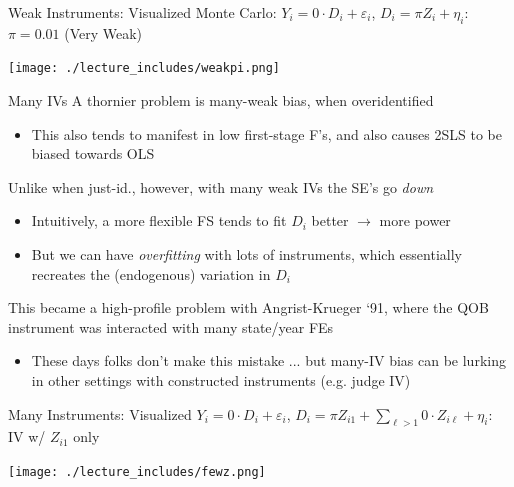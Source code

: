 \documentclass{beamer}
\begin{document}
\begin{frame}{Weak Instruments: Visualized}
\vspace{-0.2cm}
Monte Carlo: $Y_i=0\cdot D_i + \varepsilon_i$, $D_i=\pi Z_i+\eta_i$: $\pi=0.01$ (Very Weak)
\begin{center}
\texttt{[image: ./lecture\_includes/weakpi.png]}
\end{center}

\end{frame}

\begin{frame}{Many IVs}
\vspace{-0.2cm}
A thornier problem is many-weak bias, when overidentified\smallskip
\begin{itemize}
\item This also tends to manifest in low first-stage F's, and also causes 2SLS to be biased towards OLS
\end{itemize}\bigskip\pause{}

Unlike when just-id., however, with many weak IVs the SE's go \emph{down}\smallskip
\begin{itemize}
  \item Intuitively, a more flexible FS tends to fit $D_i$ better $\rightarrow$ more power\smallskip
  \item But we can have \emph{overfitting} with lots of instruments, which essentially recreates the (endogenous) variation in $D_i$ 
\end{itemize}\bigskip\pause{}

This became a high-profile problem with Angrist-Krueger ‘91, where the QOB
instrument was interacted with many state/year FEs
\smallskip
\begin{itemize}
  \item These days folks don’t make this mistake ... but many-IV bias can be
lurking in other settings with constructed instruments (e.g. judge IV)
\end{itemize}

\end{frame}

\begin{frame}{Many Instruments: Visualized}
\vspace{-0.2cm}
$Y_i=0\cdot D_i + \varepsilon_i$, $D_i=\pi Z_{i1}+\sum_{\ell>1} 0\cdot Z_{i\ell}+\eta_i$: IV w/ $Z_{i1}$ only
\begin{center}
\texttt{[image: ./lecture\_includes/fewz.png]}
\end{center}

\end{frame}
\end{document}

